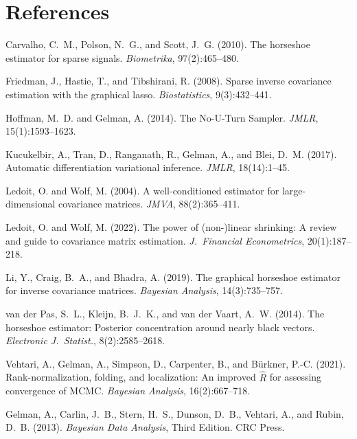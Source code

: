 \documentclass[11pt,a4paper]{article}
\begin{document}
\section*{References}

\begin{enumerate}[label={[\arabic*]},nosep]
  \item Carvalho, C.~M., Polson, N.~G., and Scott, J.~G. (2010). The horseshoe estimator for sparse signals. \textit{Biometrika}, 97(2):465--480.
  \item Friedman, J., Hastie, T., and Tibshirani, R. (2008). Sparse inverse covariance estimation with the graphical lasso. \textit{Biostatistics}, 9(3):432--441.
  \item Hoffman, M.~D. and Gelman, A. (2014). The No-U-Turn Sampler. \textit{JMLR}, 15(1):1593--1623.
  \item Kucukelbir, A., Tran, D., Ranganath, R., Gelman, A., and Blei, D.~M. (2017). Automatic differentiation variational inference. \textit{JMLR}, 18(14):1--45.
  \item Ledoit, O. and Wolf, M. (2004). A well-conditioned estimator for large-dimensional covariance matrices. \textit{JMVA}, 88(2):365--411.
  \item Ledoit, O. and Wolf, M. (2022). The power of (non-)linear shrinking: A review and guide to covariance matrix estimation. \textit{J.\ Financial Econometrics}, 20(1):187--218.
  \item Li, Y., Craig, B.~A., and Bhadra, A. (2019). The graphical horseshoe estimator for inverse covariance matrices. \textit{Bayesian Analysis}, 14(3):735--757.
  \item van der Pas, S.~L., Kleijn, B.~J.~K., and van der Vaart, A.~W. (2014). The horseshoe estimator: Posterior concentration around nearly black vectors. \textit{Electronic J.\ Statist.}, 8(2):2585--2618.
  \item Vehtari, A., Gelman, A., Simpson, D., Carpenter, B., and B\"urkner, P.-C. (2021). Rank-normalization, folding, and localization: An improved $\hat{R}$ for assessing convergence of MCMC. \textit{Bayesian Analysis}, 16(2):667--718.
  \item Gelman, A., Carlin, J.~B., Stern, H.~S., Dunson, D.~B., Vehtari, A., and Rubin, D.~B. (2013). \textit{Bayesian Data Analysis}, Third Edition. CRC Press.
\end{enumerate}
\end{document}
